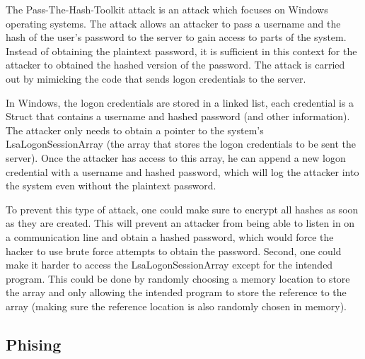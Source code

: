 \documentclass[psamsfonts]{amsart}
\begin{document}
The Pass-The-Hash-Toolkit attack is an attack which focuses on Windows operating systems. The attack allows an attacker to pass a username and the hash of the user's password to the server to gain access to parts of the system. Instead of obtaining the plaintext password, it is sufficient in this context for the attacker to obtained the hashed version of the password. The attack is carried out by mimicking the code that sends logon credentials to the server.

In Windows, the logon credentials are stored in a linked list, each credential is a Struct that contains a username and hashed password (and other information). The attacker only needs to obtain a pointer to the system's LsaLogonSessionArray (the array that stores the logon credentials to be sent the server). Once the attacker has access to this array, he can append a new logon credential with a username and hashed password, which will log the attacker into the system even without the plaintext password.

To prevent this type of attack, one could make sure to encrypt all hashes as soon as they are created. This will prevent an attacker from being able to listen in on a communication line and obtain a hashed password, which would force the hacker to use brute force attempts to obtain the password. Second, one could make it harder to access the LsaLogonSessionArray except for the intended program. This could be done by randomly choosing a memory location to store the array and only allowing the intended program to store the reference to the array (making sure the reference location is also randomly chosen in memory).

\subsection*{Phising}
\end{document}
